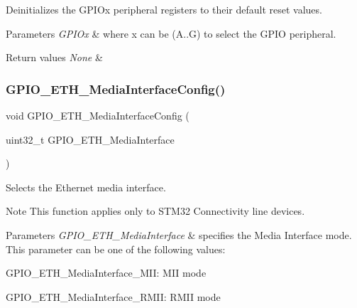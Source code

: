 Deinitializes the G\+P\+I\+Ox peripheral registers to their default reset values. 


\begin{DoxyParams}{Parameters}
{\em G\+P\+I\+Ox} & where x can be (A..G) to select the G\+P\+IO peripheral. \\
\hline
\end{DoxyParams}

\begin{DoxyRetVals}{Return values}
{\em None} & \\
\hline
\end{DoxyRetVals}
\mbox{\label{group___g_p_i_o___private___functions_gacbfad958f684347be0f2c762dc85c3c2}} 
\subsubsection{\texorpdfstring{GPIO\_ETH\_MediaInterfaceConfig()}{GPIO\_ETH\_MediaInterfaceConfig()}}
{\footnotesize\ttfamily void G\+P\+I\+O\+\_\+\+E\+T\+H\+\_\+\+Media\+Interface\+Config (\begin{DoxyParamCaption}\item[{uint32\+\_\+t}]{G\+P\+I\+O\+\_\+\+E\+T\+H\+\_\+\+Media\+Interface }\end{DoxyParamCaption})}



Selects the Ethernet media interface. 

\begin{DoxyNote}{Note}
This function applies only to S\+T\+M32 Connectivity line devices.
\end{DoxyNote}

\begin{DoxyParams}{Parameters}
{\em G\+P\+I\+O\+\_\+\+E\+T\+H\+\_\+\+Media\+Interface} & specifies the Media Interface mode. This parameter can be one of the following values\+: \begin{DoxyItemize}
\item G\+P\+I\+O\+\_\+\+E\+T\+H\+\_\+\+Media\+Interface\+\_\+\+M\+II\+: M\+II mode \item G\+P\+I\+O\+\_\+\+E\+T\+H\+\_\+\+Media\+Interface\+\_\+\+R\+M\+II\+: R\+M\+II mode\end{DoxyItemize}
\\
\hline
\end{DoxyParams}


